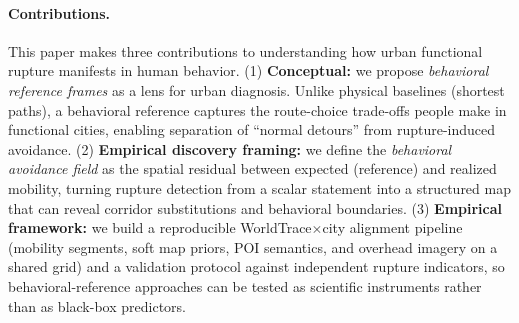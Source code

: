 \paragraph{Contributions.}
This paper makes three contributions to understanding how urban functional rupture manifests in human behavior.
(1) \textbf{Conceptual:} we propose \emph{behavioral reference frames} as a lens for urban diagnosis. Unlike physical baselines (shortest paths), a behavioral reference captures the route-choice trade-offs people make in functional cities, enabling separation of ``normal detours'' from rupture-induced avoidance.
(2) \textbf{Empirical discovery framing:} we define the \emph{behavioral avoidance field} as the spatial residual between expected (reference) and realized mobility, turning rupture detection from a scalar statement into a structured map that can reveal corridor substitutions and behavioral boundaries.
(3) \textbf{Empirical framework:} we build a reproducible WorldTrace$\times$city alignment pipeline (mobility segments, soft map priors, POI semantics, and overhead imagery on a shared grid) and a validation protocol against independent rupture indicators, so behavioral-reference approaches can be tested as scientific instruments rather than as black-box predictors.

